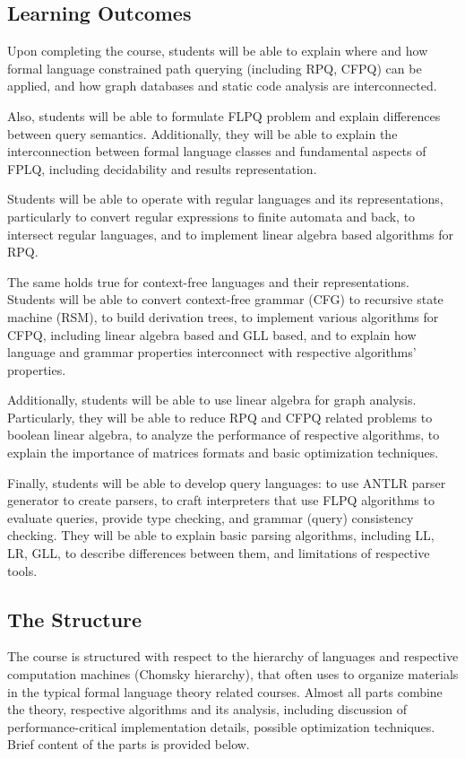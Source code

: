 \documentclass[sigconf]{acmart}
\begin{document}
\subsection{Learning Outcomes}

Upon completing the course, students will be able to explain where and how formal language constrained path querying (including RPQ, CFPQ) can be applied, and how graph databases and static code analysis are interconnected.

Also, students will be able to formulate FLPQ problem and explain differences between query semantics.
Additionally, they will be able to explain the interconnection between formal language classes and fundamental aspects of FPLQ, including decidability and results representation.

Students will be able to operate with regular languages and its representations, particularly to convert regular expressions to finite automata and back, to intersect regular languages, and to implement linear algebra based algorithms for RPQ. 

The same holds true for context-free languages and their representations.
Students will be able to convert context-free grammar (CFG) to recursive state machine (RSM), to build derivation trees, to implement various algorithms for CFPQ, including linear algebra based and GLL based, and to explain how language and grammar properties interconnect with respective algorithms' properties. 

Additionally, students will be able to use linear algebra for graph analysis. 
Particularly, they will be able to reduce RPQ and CFPQ related problems to boolean linear algebra, to analyze the performance of respective algorithms, to explain the importance of matrices formats and basic optimization techniques.

Finally, students will be able to develop query languages: to use ANTLR parser generator to create parsers, to craft interpreters that use FLPQ algorithms to evaluate queries, provide type checking, and grammar (query) consistency checking.
They will be able to explain basic parsing algorithms, including LL, LR, GLL, to describe differences between them, and limitations of respective tools. 


\subsection{The Structure}

The course is structured with respect to the hierarchy of languages and respective computation machines (Chomsky hierarchy), that often uses to organize materials in the typical formal language theory related courses.
Almost all parts combine the theory, respective algorithms and its analysis, including discussion of performance-critical implementation details, possible optimization techniques. 
Brief content of the parts is provided below.
\end{document}
